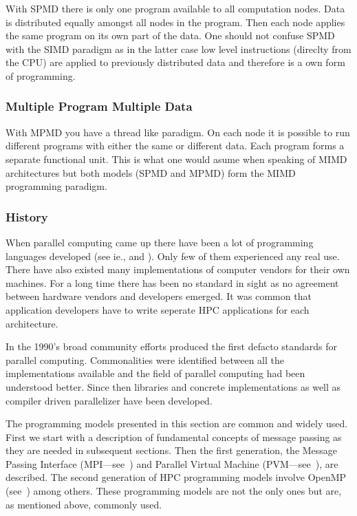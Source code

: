 With SPMD there is only one program available
to all computation nodes. Data is distributed equally amongst all
nodes in the program. Then each node applies the same program on its
own part of the data. One should not confuse SPMD with the SIMD
paradigm as in the latter case low level instructions (direclty from
the CPU) are applied to previously distributed data and therefore is a
own form of programming.

\subsubsection{Multiple Program Multiple Data}

With MPMD you have a thread like paradigm. On each node it is possible
to run different programs with either the same or different data. Each
program forms a separate functional unit. This
is what one would asume when speaking of MIMD architectures but both
models (SPMD and MPMD) form the MIMD programming paradigm.

\subsubsection{History}

When parallel computing came up there have been a lot of programming
languages developed (see ie., \cite{gehani88:concurrentprog} and
\cite{wilson96:parallelprog}). Only few of them experienced any real use. There
have also existed many implementations of computer vendors for their own
machines. For a long time there has been no standard in sight as no
agreement between hardware vendors and developers emerged. It was
common that application developers have to write seperate HPC
applications for each architecture.

In the 1990's broad community efforts produced the first defacto
standards for parallel computing. Commonalities were identified
between all the implementations available and the field of parallel
computing had been understood better. Since then libraries and concrete
implementations as well as compiler driven parallelizer have been
developed.


The programming models presented in this section are common and widely
used. First we start with a description of fundamental concepts of
message passing as they are needed in subsequent sections. Then the
first generation, the Message Passing Interface 
(MPI---see~\cite{forum94:MPI}) and Parallel Virtual Machine
(PVM---see~\cite{geist94pvm}),
are described. The second generation of HPC programming
models involve OpenMP (see~\cite{openMP05}) among others. These
programming models are not the only ones 
but are, as mentioned above, commonly used. 

